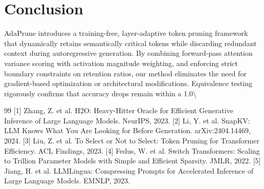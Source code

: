 \documentclass[11pt,a4paper]{article}
\begin{document}
\section{Conclusion}
AdaPrune introduces a training-free, layer-adaptive token pruning framework that dynamically retains semantically critical tokens while discarding redundant context during autoregressive generation. By combining forward-pass attention variance scoring with activation magnitude weighting, and enforcing strict boundary constraints on retention ratios, our method eliminates the need for gradient-based optimization or architectural modifications. Equivalence testing rigorously confirms that accuracy drops remain within a 1.0\textbackslash{}%


\begin{thebibliography}{99}
 [1] Zhang, Z. et al. H2O: Heavy-Hitter Oracle for Efficient Generative Inference of Large Language Models. NeurIPS, 2023.
 [2] Li, Y. et al. SnapKV: LLM Knows What You Are Looking for Before Generation. arXiv:2404.14469, 2024.
 [3] Liu, Z. et al. To Select or Not to Select: Token Pruning for Transformer Efficiency. ACL Findings, 2023.
 [4] Fedus, W. et al. Switch Transformers: Scaling to Trillion Parameter Models with Simple and Efficient Sparsity. JMLR, 2022.
 [5] Jiang, H. et al. LLMLingua: Compressing Prompts for Accelerated Inference of Large Language Models. EMNLP, 2023.
\end{thebibliography}
\end{document}
